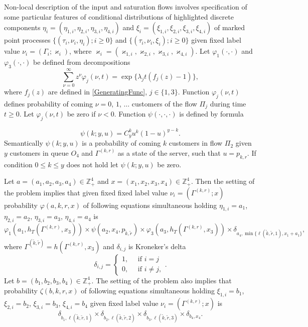 \documentclass[10pt]{article}
\begin{document}
Non-local description of the input and saturation flows involves specification of some particular features of conditional distributions of highlighted discrete components $\eta_i=(\eta_{1,i},\eta_{2,i}, \eta_{3,i}, \eta_{4,i})$ and $\xi_i=(\xi_{1,i}, \xi_{2,i}, \xi_{3,i}, \xi_{4,i})$ of marked point processes $\{(\tau_i, \nu_i, \eta_i); i\geqslant 0\}$ and $\{(\tau_i, \nu_i, \xi_i); i\geqslant 0\}$ given fixed label value $\nu_i = (\Gamma_i;\varkappa_i)$, where $\varkappa_i=(\varkappa_{1,i},\varkappa_{2,i},\varkappa_{3,i},\varkappa_{4,i})$. 
Let $\varphi_1(\cdot,\cdot)$ and $\varphi_3(\cdot,\cdot)$ be defined from decompositions 
\begin{equation*}
\sum_{\nu=0}^{\infty} z^\nu\varphi_j(\nu,t) = \exp\{\lambda_j t (f_j(z)-1)\},
\end{equation*}
where $f_j(z)$ are defined in \eqref{GeneratingFunc}, $j \in \{1,3\}$. Function $\varphi_j(\nu,t)$ defines probability of coming $\nu=0$, $1$, $\ldots$ customers of the flow $\Pi_j$ during time $t \geqslant 0$. Let $\varphi_j(\nu,t)$ be zero if $\nu < 0$. Function $\psi(\cdot,\cdot,\cdot)$ is defined by formula

\begin{equation*}
\psi(k;y,u)=C_y^k u^k (1-u)^{y-k}.	
\end{equation*}
Semantically $\psi(k;y,u)$ is a probability of coming $k$ customers in flow $\Pi_2$ given $y$ customers in queue $O_4$ and $\Gamma^{(k,r)}$ as a state of the server, such that $u=p_{k,r}$. If condition $ 0\leqslant k \leqslant y$ does not hold let $\psi(k;y,u)$ be zero.




Let $a=(a_1, a_2, a_3, a_4) \in \mathbb{Z}_+^4$ and $x=(x_1, x_2, x_3, x_4) \in \mathbb{Z}_+^4$. Then the setting of the problem implies that given fixed fixed label value $\nu_i=(\Gamma^{(k,r)}; x)$ probability $\varphi(a,k,r,x)$ of following equations simultaneous holding $\eta_{1,i}=a_1$, $\eta_{2,i}=a_2$, $\eta_{3,i}=a_3$, $\eta_{4,i}=a_4$ is
\begin{equation}
\varphi_1(a_1,h_T(\Gamma^{(k,r)},x_3)) \times \psi(a_2,x_4, p_{\tilde{k},\tilde{r}}) \times \varphi_3(a_3,h_T(\Gamma^{(k,r)},x_3))
\times \delta_{a_4,\min{\{\ell(\tilde{k},\tilde{r},1), x_1+a_1}\}},
\label{conditionProbOne}
\end{equation}
where $\Gamma^{(\tilde{k},\tilde{r})}=h(\Gamma^{(k,r)},x_3)$ and $\delta_{i,j}$ is Kroneker's delta
\begin{equation*}
\delta_{i,j}=\begin{cases} 1, \quad \text{ if }i=j\\0, \quad \text{ if } i\neq j,
\end{cases}.
\end{equation*}
Let $b=(b_1, b_2, b_3, b_4) \in \mathbb{Z}_+^4$. The setting of the problem also implies that probability $\zeta(b, k, r, x)$  of following equations simultaneous holding $\xi_{1,i}=b_1$, $\xi_{2,i}=b_2$, $\xi_{3,i}=b_3$, $\xi_{4,i}=b_4$ given fixed label value $\nu_i=(\Gamma^{(k,r)}; x)$ is
\begin{equation}
\delta_{b_1,\ell(\tilde{k},\tilde{r},1)} \times \delta_{b_2,\ell(\tilde{k},\tilde{r},2)} \times 
\delta_{b_3,\ell(\tilde{k},\tilde{r},3)} \times \delta_{b_4,x_4}.
\label{conditionProbTwo}
\end{equation}
\end{document}
